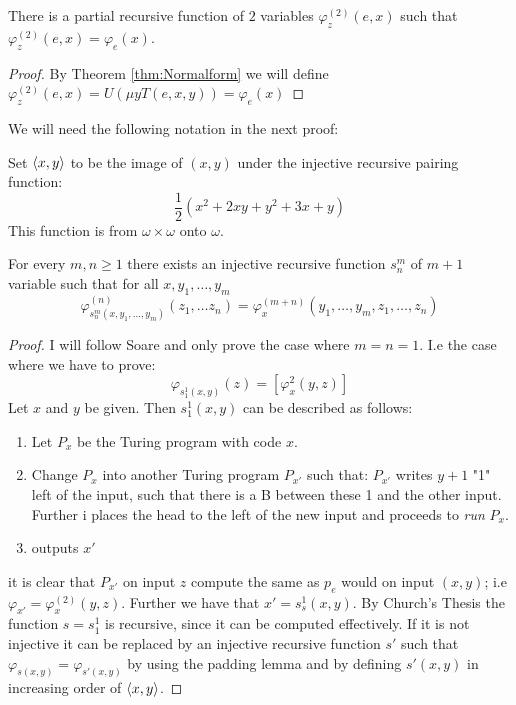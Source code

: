 \documentclass[../main.tex]{subfiles}
\begin{document}
\begin{thm}
	\label{thm:Emu}
	There is a partial recursive function of $2$ variables
	$\varphi_z^{(2)}(e,x)$ such that $\varphi_z^{(2)}(e,x)=\varphi_e(x)$.
\end{thm}
\begin{proof}
	By Theorem \ref{thm:Normalform} we will define
	$\varphi_z^{(2)}(e,x)=U(\mu y T(e,x,y))=\varphi_e(x)$
\end{proof}
We will need the following notation in the next proof:
\begin{defi}
	Set $\langle x,y\rangle$ to be the image of $(x,y)$ under the injective
	recursive  pairing function:
	$$\frac{1}{2}(x^2+2xy+y^2+3x+y)$$
	This function is from $\omega\times\omega$ onto $\omega$.
\end{defi}
\begin{thm}[s-m-n theorem]
	For every $m,n\geq 1$ there exists an injective recursive function
	$s_n^m$ of $m+1$ variable such that for all $x,y_1,\ldots,y_m$
	\[\varphi^{(n)}_{s^m_n(x,y_1,\ldots,y_m)}(z_1,\ldots z_n)=
	\varphi^{(m+n)}_x(y_1,\ldots,y_m,z_1,\ldots,z_n)\]
\end{thm}
\begin{proof}
	I will follow Soare and only prove the case where $m=n=1$. I.e the case
	where we have to prove:
	\[\varphi_{s^1_1(x,y)}(z)=[\varphi_x^{2}(y,z)]\]
	Let $x$ and $y$ be given. Then $s^1_1(x,y)$ can be described as
	follows:
	\begin{enumerate}
		\item Let $P_x$ be the Turing program with code $x$.
		\item Change $P_x$ into another Turing program $P_{x'}$ such
			that: $P_{x'}$ writes $y+1$ "1" left of the input, such
			that there is a B between these 1 and the other input.
			Further i places the head to the left of the new input
			and proceeds to \textit{run} $P_x$.
		\item outputs $x'$
	\end{enumerate}
	it is clear that $P_{x'}$ on input $z$ compute the same as $p_e$ would
	on input $(x,y)$; i.e $\varphi_{x'}=\varphi_x^{(2)}(y,z)$. Further we
	have that $x'=s^1_s(x,y)$.
	By Church's Thesis the function $s=s^1_1$ is recursive, since it can be
	computed effectively. If it is not injective it can be replaced by an
	injective recursive function $s'$ such that
	$\varphi_{s(x,y)}=\varphi_{s'(x,y)}$ by using the padding lemma and by
	defining $s'(x,y)$ in increasing order of $\langle x,y\rangle$.
\end{proof}
\end{document}
